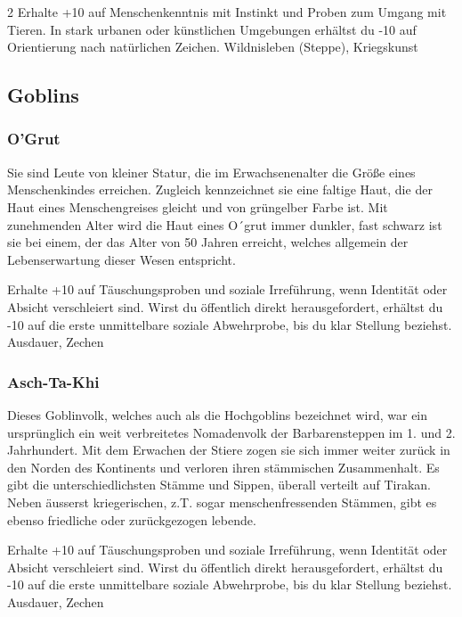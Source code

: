 {\begin{multicols*}{2}
        \abstammungspielwertebox
        {Erhalte +10 auf Menschenkenntnis mit Instinkt und Proben zum Umgang mit Tieren.}
        {In stark urbanen oder künstlichen Umgebungen erhältst du -10 auf Orientierung nach natürlichen Zeichen.}
        {Wildnisleben (Steppe), Kriegskunst}

        \subsection{Goblins}\label{subsec:abstammungen-goblins}

        \subsubsection*{O'Grut}
        Sie sind Leute von kleiner Statur, die im Erwachsenenalter die Größe eines Menschenkindes erreichen. Zugleich kennzeichnet sie eine faltige Haut, die der Haut eines Menschengreises gleicht und von grüngelber Farbe ist. Mit zunehmenden Alter wird die Haut eines O´grut immer dunkler, fast schwarz ist sie bei einem, der das Alter von 50 Jahren erreicht, welches allgemein der Lebenserwartung dieser Wesen entspricht.

        \abstammungspielwertebox
        {Erhalte +10 auf Täuschungsproben und soziale Irreführung, wenn Identität oder Absicht verschleiert sind.}
        {Wirst du öffentlich direkt herausgefordert, erhältst du -10 auf die erste unmittelbare soziale Abwehrprobe, bis du klar Stellung beziehst.}
        {Ausdauer, Zechen}

        \subsubsection*{Asch-Ta-Khi}
        Dieses Goblinvolk, welches auch als die Hochgoblins bezeichnet wird, war ein ursprünglich ein weit verbreitetes Nomadenvolk der Barbarensteppen im 1. und 2. Jahrhundert. Mit dem Erwachen der Stiere zogen sie sich immer weiter zurück in den Norden des Kontinents und verloren ihren stämmischen Zusammenhalt. Es gibt die unterschiedlichsten Stämme und Sippen, überall verteilt auf Tirakan. Neben äusserst kriegerischen, z.T. sogar menschenfressenden Stämmen, gibt es ebenso friedliche oder zurückgezogen lebende.

        \abstammungspielwertebox
        {Erhalte +10 auf Täuschungsproben und soziale Irreführung, wenn Identität oder Absicht verschleiert sind.}
        {Wirst du öffentlich direkt herausgefordert, erhältst du -10 auf die erste unmittelbare soziale Abwehrprobe, bis du klar Stellung beziehst.}
        {Ausdauer, Zechen}


\end{multicols*}}
